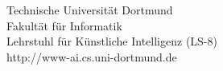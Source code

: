 \begin{titlepage}
\vspace*{2.5cm}
\hspace*{\links}
\begin{minipage}[b]{8cm}
\raggedright
Technische Universität Dortmund \\
Fakultät für Informatik\\
Lehrstuhl für Künstliche Intelligenz (LS-8)\\
http://www-ai.cs.uni-dortmund.de
\end{minipage}

\end{titlepage}